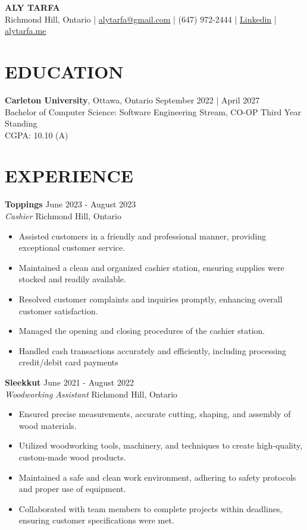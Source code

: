 \documentclass[a4paper,10pt]{extarticle}
\begin{document}
\pagestyle{empty}

\begin{center}
	\textbf{\Large ALY TARFA}\\[2pt]
	Richmond Hill, Ontario | \href{mailto:alytarfa@gmail.com}{alytarfa@gmail.com} | (647) 972-2444 | \href{https://www.linkedin.com/in/aly-tarfa-b18b59225/}{Linkedin} | \href{https://alytarfa.me/}{alytarfa.me}
\end{center}

\section*{EDUCATION}
\noindent
\textbf{Carleton University}, Ottawa, Ontario \hfill September 2022 | April 2027\\
Bachelor of Computer Science: Software Engineering Stream, CO-OP \hfill Third Year Standing\\
CGPA: 10.10 (A)

\section*{EXPERIENCE}

\noindent
\textbf{Toppings} \hfill June 2023 - August 2023\\
\textit{Cashier} \hfill Richmond Hill, Ontario
\begin{itemize}
	\item Assisted customers in a friendly and professional manner, providing exceptional customer service.
	\item Maintained a clean and organized cashier station, ensuring supplies were stocked and readily available.
    \item Resolved customer complaints and inquiries promptly, enhancing overall customer satisfaction.
    \item Managed the opening and closing procedures of the cashier station.
    \item Handled cash transactions accurately and efficiently, including processing credit/debit card payments
\end{itemize}

\noindent
\textbf{Sleekkut} \hfill June 2021 - August 2022\\
\textit{Woodworking Assistant} \hfill Richmond Hill, Ontario
\begin{itemize}
	\item Ensured precise measurements, accurate cutting, shaping, and assembly of wood materials.
	\item Utilized woodworking tools, machinery, and techniques to create high-quality, custom-made wood products.
    \item Maintained a safe and clean work environment, adhering to safety protocols and proper use of equipment.
    \item Collaborated with team members to complete projects within deadlines, ensuring customer specifications were met.
\end{itemize}
\end{document}
